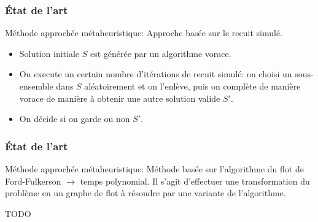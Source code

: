 \documentclass[aspectratio=169,11pt]{beamer}
\begin{document}
	\begin{frame}
		\frametitle{État de l'art}
		\begin{block}{Méthode approchée métaheuristique: \citeauthor{jacobs1995lsh}}
			Approche basée sur le recuit simulé.~\cite{jacobs1995lsh}
			\begin{itemize}
				\item Solution initiale \(S\) est générée par un algorithme vorace.
				\item On execute un certain nombre d'itérations de recuit simulé:
				on choisi un sous-ensemble dans \(S\) aléatoirement
				et on l'enlève, puis on complète de manière vorace de manière à obtenir une autre solution valide \(S'\).
				\item On décide si on garde ou non \(S'\).
			\end{itemize}
		\end{block}
	\end{frame}

	\begin{frame}
		\frametitle{État de l'art}
		\begin{block}{Méthode approchée métaheuristique: \citeauthor{Afif1995}}
			Méthode basée sur l'algorithme du flot de Ford-Fulkerson \(\rightarrow\) temps polynomial. Il s'agit d'effectuer une transformation du problème en un graphe de flot à résoudre par une variante de l'algorithme.~\cite{Afif1995}
		\end{block}
	\end{frame}


	\begin{frame}
		\centering TODO
	\end{frame}

\end{document}
